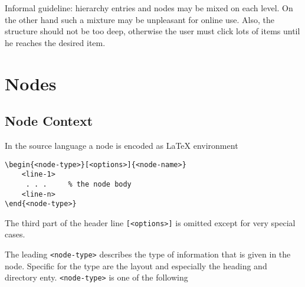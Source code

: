 Informal guideline: hierarchy entries and nodes may be mixed on each level.
On the other hand such a mixture may be unpleasant for online use. Also, the
structure should not be too deep, otherwise the user must click lots of
items until he reaches the desired item.

\section{Nodes}

\subsection{Node Context}

In the source language a node is encoded as \LaTeX{} environment
\begin{verbatim}
\begin{<node-type>}[<options>]{<node-name>}
    <line-1>
     . . .     % the node body
    <line-n>
\end{<node-type>}
\end{verbatim}

The third part of the header line \verb|[<options>]| is omitted except for
very special cases.

The leading \verb|<node-type>| describes the type of information that is
given in the node. Specific for the type are the layout and especially the
heading and directory enty. \verb|<node-type>| is one of the following

